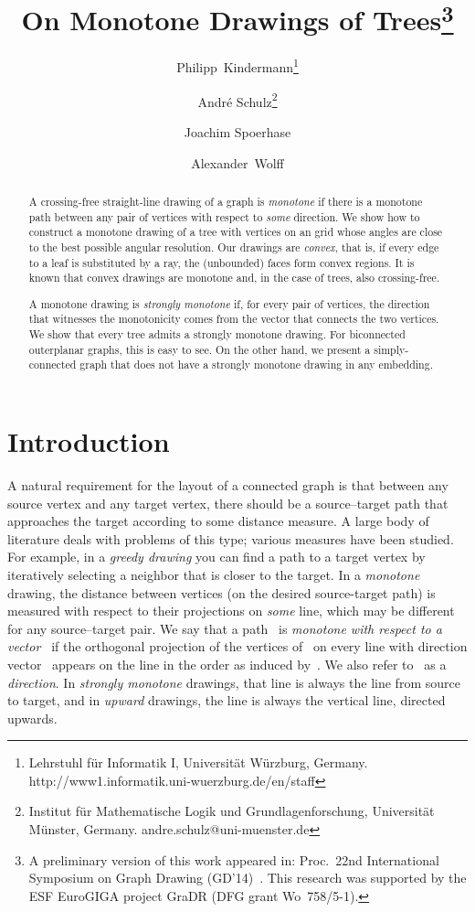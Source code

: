 \documentclass[a4paper,11pt]{article}
\title{On Monotone Drawings of Trees\thanks{A preliminary version of this work 
	appeared in: Proc.\ 22nd International Symposium on Graph Drawing
	(GD'14)~\cite{kssw-omdt-14}. This research was
    supported by the ESF EuroGIGA project GraDR (DFG grant
    Wo~758/5-1).}}
\author{Philipp~Kindermann\thanks{Lehrstuhl f\"ur Informatik I,
  Universit\"at W\"urzburg, Germany.
  \mbox{http://www1.informatik.uni-wuerzburg.de/en/staff}}
\and
Andr{\'e} Schulz\thanks{Institut f\"ur Mathematische Logik und
  Grundlagenforschung, Universit\"at M\"unster, Germany.
  \mbox{andre.schulz@uni-muenster.de}}
\and
  Joachim Spoerhase\footnotemark[2]
\and
Alexander~Wolff\footnotemark[2]
}
\date{}
\theoremstyle{plain}
\begin{document}
\maketitle

\begin{abstract}
  A crossing-free straight-line drawing of a graph is \emph{monotone} if
  there is a monotone path between any pair of vertices with respect
  to \emph{some} direction.  We show how to construct a monotone drawing 
  of a tree with  vertices on an  grid
  whose angles are close to the best possible angular resolution.  Our
  drawings are \emph{convex}, that is, if every edge to a leaf is
  substituted by a ray, the (unbounded) faces form convex regions.
  It is known that convex drawings are monotone and, in the case of
  trees, also crossing-free.

  A monotone drawing is \emph{strongly monotone} if, for every pair of
  vertices, the direction that witnesses the monotonicity comes from the
  vector that connects the two vertices.  We show that every tree admits
  a strongly monotone drawing.  For biconnected outerplanar graphs,
  this is easy to see.  On the other hand, we present a
  simply-connected graph that does not have a strongly monotone
  drawing in any embedding.
\end{abstract}

\section{Introduction}

A natural requirement for the layout of a connected graph is that
between any source vertex and any target vertex, there should be a
source--target path that approaches the target according to some
distance measure.  A large body of literature deals with problems of
this type; various measures have been studied.  For example, in a
\emph{greedy drawing} you can find a path to a target vertex by iteratively
selecting a neighbor that is closer to the target.  
In a \emph{monotone} drawing, the distance between vertices (on the desired
source-target path) is measured with respect to their projections on
\emph{some} line, which may be different for any source--target pair.
We say that a path~ is \emph{monotone with respect to a vector~}
if the orthogonal projection of the vertices of~ on every line with direction 
vector~ appears on the line in the order as induced by~.
We also refer to~ as a \emph{direction}.
In \emph{strongly monotone} drawings, that line is always the line
from source to target, and in \emph{upward} drawings, the line is
always the vertical line, directed upwards.
\end{document}
